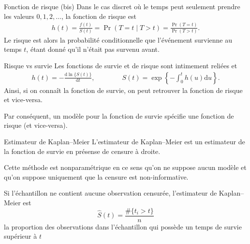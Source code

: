 \documentclass[
  ignorenonframetext,
]{beamer}
\begin{document}
\begin{frame}{Fonction de risque (bis)}
\protect\hypertarget{fonction-de-risque-bis}{}
Dans le cas discret où le temps peut seulement prendre les valeurs
\(0, 1, 2, \ldots\), la fonction de risque est \begin{align*}
h(t)= \frac{f(t)}{S(t)} = \Pr(T=t \mid T > t) = \frac{\Pr(T=t)}{\Pr(T >t)}.
\end{align*} Le risque est alors la probabilité conditionnelle que
l'événement survienne au temps \(t\), étant donné qu'il n'était pas
survenu avant.
\end{frame}

\begin{frame}{Risque vs survie}
\protect\hypertarget{risque-vs-survie}{}
Les fonctions de survie et de risque sont intimement reliées et
\begin{align*}
h(t) = - \frac{\mathrm{d} \ln\{S(t)\}}{\mathrm{d} t}, \qquad \qquad S(t) = \exp \left\{ -\int_0^t h(u) \mathrm{d} u\right\}.
\end{align*} Ainsi, si on connaît la fonction de survie, on peut
retrouver la fonction de risque et vice-versa.

Par conséquent, un modèle pour la fonction de survie spécifie une
fonction de risque (et vice-versa).
\end{frame}

\begin{frame}{Estimateur de Kaplan--Meier}
\protect\hypertarget{estimateur-de-kaplanmeier}{}
L'estimateur de Kaplan--Meier est un estimateur de la fonction de survie
en présense de censure à droite.

Cette méthode est nonparamétrique en ce sens qu'on ne suppose aucun
modèle et qu'on suppose uniquement que la censure est non-informative.

Si l'échantillon ne contient aucune observation censurée, l'estimateur
de Kaplan--Meier est \[\widehat{S}(t) = \frac{\#\{t_i > t\}}{n}\] la
proportion des observations dans l'échantillon qui possède un temps de
survie supérieur à \(t\)
\end{frame}
\end{document}
